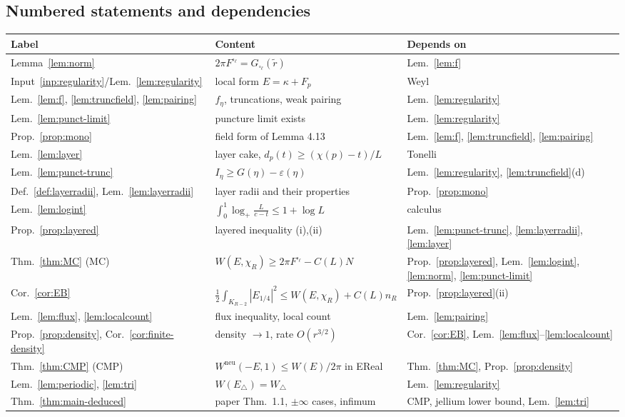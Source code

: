 \documentclass[11pt]{article}
\theoremstyle{definition}
\theoremstyle{remark}
\newcommand{\Wneu}{W^{\mathrm{neu}}}
\newcommand{\logp}{\log_+}
\begin{document}
\subsection{Numbered statements and dependencies}
\begin{center}\small
\begin{tabular}{@{}lll@{}}
\hline
\textbf{Label} & \textbf{Content} & \textbf{Depends on}\\\hline
Lemma~\ref{lem:norm} & $2\pi F^{\square_\ell}=G_{\square_\ell}(\tilde r)$ & Lem.~\ref{lem:f}\\
Input~\ref{inp:regularity}/Lem.~\ref{lem:regularity} & local form $E=\kappa+F_p$ & Weyl\\
Lem.~\ref{lem:f}, \ref{lem:truncfield}, \ref{lem:pairing} & $f_\eta$, truncations, weak pairing & Lem.~\ref{lem:regularity}\\
Lem.~\ref{lem:punct-limit} & puncture limit exists & Lem.~\ref{lem:regularity}\\
Prop.~\ref{prop:mono} & field form of Lemma 4.13 & Lem.~\ref{lem:f}, \ref{lem:truncfield}, \ref{lem:pairing}\\
Lem.~\ref{lem:layer} & layer cake, $d_p(t)\ge(\chi(p)-t)/L$ & Tonelli\\
Lem.~\ref{lem:punct-trunc} & $I_\eta\ge G(\eta)-\varepsilon(\eta)$ & Lem.~\ref{lem:regularity}, \ref{lem:truncfield}(d)\\
Def.~\ref{def:layerradii}, Lem.~\ref{lem:layerradii} & layer radii and their properties & Prop.~\ref{prop:mono}\\
Lem.~\ref{lem:logint} & $\int_0^1\!\logp\!\frac L{c-t}\le1+\log L$ & calculus\\
Prop.~\ref{prop:layered} & layered inequality (i),(ii) & Lem.~\ref{lem:punct-trunc}, \ref{lem:layerradii}, \ref{lem:layer}\\
Thm.~\ref{thm:MC} (MC) & $W(E,\chi_R)\ge2\pi F^{\square_\ell}-C(L)N$ & Prop.~\ref{prop:layered}, Lem.~\ref{lem:logint}, \ref{lem:norm}, \ref{lem:punct-limit}\\
Cor.~\ref{cor:EB} & $\frac12\!\int_{K_{R-2}}|E_{1/4}|^2\le W(E,\chi_R)+C(L)n_R$ & Prop.~\ref{prop:layered}(ii)\\
Lem.~\ref{lem:flux}, \ref{lem:localcount} & flux inequality, local count & Lem.~\ref{lem:pairing}\\
Prop.~\ref{prop:density}, Cor.~\ref{cor:finite-density} & density $\to1$, rate $O(r^{3/2})$ & Cor.~\ref{cor:EB}, Lem.~\ref{lem:flux}--\ref{lem:localcount}\\
Thm.~\ref{thm:CMP} (CMP) & $\Wneu(-E,1)\le W(E)/2\pi$ in EReal & Thm.~\ref{thm:MC}, Prop.~\ref{prop:density}\\
Lem.~\ref{lem:periodic}, \ref{lem:tri} & $W(E_\triangle)=W_\triangle$ & Lem.~\ref{lem:regularity}\\
Thm.~\ref{thm:main-deduced} & paper Thm.~1.1, $\pm\infty$ cases, infimum & CMP, jellium lower bound, Lem.~\ref{lem:tri}\\\hline
\end{tabular}
\end{center}
\end{document}
